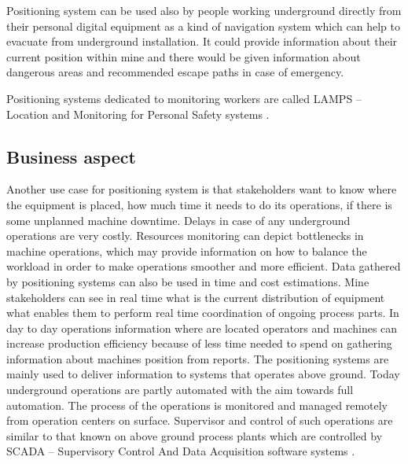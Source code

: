 \documentclass[../main.tex]{subfiles}
\begin{document}
Positioning system can be used also by people working underground directly from their personal digital equipment\cite{Thesis_CM} as a kind of navigation system which can help to evacuate from underground installation. It could provide information about their current position within mine and there would be given information about dangerous areas and recommended escape paths in case of emergency.

Positioning systems dedicated to monitoring workers are called LAMPS -- Location and Monitoring for Personal Safety systems \cite{Book_wireless_in_mines}.

\subsection{Business aspect} %
\label{sub:business_aspect}

Another use case for positioning system is that stakeholders want to know where the equipment is placed, how much time it needs to do its operations, if there is some unplanned machine downtime. Delays in case of any underground operations are very costly. Resources monitoring can depict bottlenecks in machine operations, which may provide information on how to balance the workload in order to make operations smoother and more efficient. Data gathered by positioning systems can also be used in time and cost estimations. Mine stakeholders can see in real time what is the current distribution of equipment what enables them to perform real time coordination of ongoing process parts. In day to day operations information where are located operators and machines can increase production efficiency because of less time needed to spend on gathering information about machines position from reports\cite{thesis_tablet_positioning}. The positioning systems are mainly used to deliver information to systems that operates above ground. Today underground operations are partly automated with the aim towards full automation. The process of the operations is monitored and managed remotely from operation centers on surface. Supervisor and control of such operations are similar to that known on above ground process plants which are controlled by SCADA -- Supervisory Control And Data Acquisition software systems \cite{Thesis_CM}.
\end{document}
